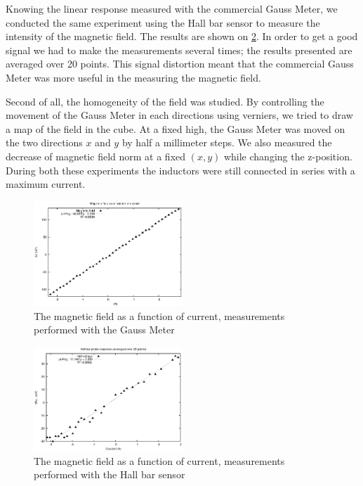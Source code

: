 \documentclass[journal]{IEEEtran}
\begin{document}
Knowing the linear response measured with the commercial Gauss Meter, we conducted the same experiment using the Hall bar sensor to measure the intensity of the magnetic field. The results are shown on \figurename \ref{fig:linear_hall_20}. In order to get a good signal we had to make the measurements several times; the results presented are averaged over 20 points. This signal distortion meant that the commercial Gauss Meter was more useful in the measuring the magnetic field.

Second of all, the homogeneity of the field was studied. By controlling the movement of the Gauss Meter in each directions using verniers, we tried to draw a map of the field in the cube. At a fixed high, the Gauss Meter was moved on the two directions $x$ and $y$ by half a millimeter steps. We also measured the decrease of magnetic field norm at a fixed $(x,y)$ while changing the z-position. During both these experiments the inductors were still connected in series with a maximum current.





\begin{figure}[h]
\centering
\includegraphics[width=0.5\textwidth]{champ_fonction_courant.eps}
\caption{The magnetic field as a function of current, measurements performed with the Gauss Meter}
\label{fig:linear_gauss}
\end{figure}



\begin{figure}[h]
\centering

\includegraphics[width=0.5\textwidth]{rampe_courant_20.eps}
\caption{The magnetic field as a function of current, measurements performed with the Hall bar sensor}
\label{fig:linear_hall_20}
\end{figure}
\end{document}
